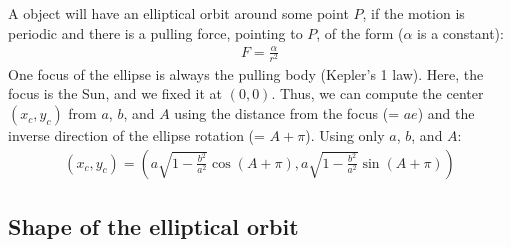\begin{appendices}
A object will have an elliptical orbit around some point $P$, if the motion is periodic and there is a pulling force, pointing to $P$, of the form ($\alpha$ is a constant):
\begin{eqnarray*}
F = \frac{\alpha}{r^2}
\end{eqnarray*}
One focus of the ellipse is always the pulling body (Kepler's 1 law). Here, the focus is the Sun, and we fixed it at $(0,0)$. Thus, we can compute the center $(x_c,y_c)$ from $a$, $b$, and $A$ using the distance from the focus (= $ae$) and the inverse direction of the ellipse rotation (= $A+\pi$). Using only $a$, $b$, and $A$:
\begin{eqnarray*}
(x_c,y_c) = (a\sqrt{1 - \frac{b^2}{a^2}}\cos{(A+\pi)},a\sqrt{1 - \frac{b^2}{a^2}}\sin{(A+\pi)})
\end{eqnarray*}

\subsection{Shape of the elliptical orbit}


\end{appendices}

